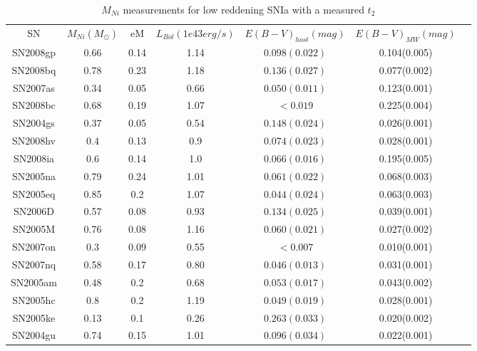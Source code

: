 \begin{table*}
\caption{$M_{Ni}$ measurements for low reddening SNIa with a measured $t_2$}
\begin{tabular}{ccccccc}
\hline
SN  & $M_{Ni} (M_{\odot})$ & eM & $L_{Bol} (1e43 erg/s) $ & $E(B-V)_{host} (mag)$ & $E(B-V)_{MW} (mag)$ & \\
SN2008gp	&	0.66	&	0.14	&	1.14	&	$0.098(0.022)$	&	0.104(0.005)	&	\\
SN2008bq	&	0.78	&	0.23	&	1.18	&	$0.136(0.027)$	&	0.077(0.002)	&	\\
SN2007as	&	0.34	&	0.05	&	0.66	&	$0.050(0.011)$	&	0.123(0.001)	&	\\
SN2008bc	&	0.68	&	0.19	&	1.07	&	$<0.019$	&	0.225(0.004)	&	\\
SN2004gs	&	0.37	&	0.05	&	0.54	&	$0.148(0.024)$	&	0.026(0.001)	&	\\
SN2008hv	&	0.4	&	0.13	&	0.9	&	$0.074(0.023)$	&	0.028(0.001)	&	\\
SN2008ia	&	0.6	&	0.14	&	1.0	&	$0.066(0.016)$	&	0.195(0.005)	&	\\
SN2005na	&	0.79	&	0.24	&	1.01	&	$0.061(0.022)$	&	0.068(0.003)	&	\\
SN2005eq	&	0.85	&	0.2	&	1.07	&	$0.044(0.024)$	&	0.063(0.003)	&	\\
SN2006D		&	0.57	&	0.08	&	0.93	&	$0.134(0.025)$	&	0.039(0.001)	&	\\
SN2005M		&	0.76	&	0.08	&	1.16	&	$0.060(0.021)$	&	0.027(0.002)	&	\\
SN2007on	&	0.3	&	0.09	&	0.55	&	$<0.007$	&	0.010(0.001)	&	\\
SN2007nq	&	0.58	&	0.17	&	0.80	&	$0.046(0.013)$	&	0.031(0.001)	&	\\
SN2005am	&	0.48	&	0.2	&	0.68	&	$0.053(0.017)$	&	0.043(0.002)	&	\\
SN2005hc	&	0.8	&	0.2	&	1.19	&	$0.049(0.019)$	&	0.028(0.001)	&	\\
SN2005ke	&	0.13	&	0.1	&	0.26	&	$0.263(0.033)$	&	0.020(0.002)	&	\\
SN2004gu	&	0.74	&	0.15	&	1.01	&	$0.096(0.034)$	&	0.022(0.001)	&	\\
\hline
\end{tabular}
\label{tab:mni}
\end{table*}
